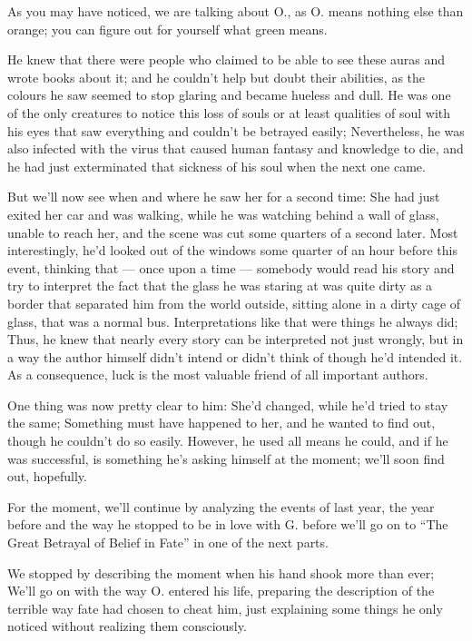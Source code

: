 As you may have noticed, we are talking about O., as O. means nothing else than orange; you can figure out for yourself what green means.

He knew that there were people who claimed to be able to see these auras and wrote books about it; and he couldn't help but doubt their abilities, as the colours he saw seemed to stop glaring and became hueless and dull. He was one of the only creatures to notice this loss of souls or at least qualities of soul with his eyes that saw everything and couldn't be betrayed easily; Nevertheless, he was also infected with the virus that caused human fantasy and knowledge to die, and he had just exterminated that sickness of his soul when the next one came.

But we'll now see when and where he saw her for a second time: She had just exited her car and was walking, while he was watching behind a wall of glass, unable to reach her, and the scene was cut some quarters of a second later. Most interestingly, he'd looked out of the windows some quarter of an hour before this event, thinking that --- once upon a time --- somebody would read his story and try to interpret the fact that the glass he was staring at was quite dirty as a border that separated him from the world outside, sitting alone in a dirty cage of glass, that was a normal bus. Interpretations like that were things he always did; Thus, he knew that nearly every story can be interpreted not just wrongly, but in a way the author himself didn't intend or didn't think of though he'd intended it. As a consequence, luck is the most valuable friend of all important authors.

One thing was now pretty clear to him: She'd changed, while he'd tried to stay the same; Something must have happened to her, and he wanted to find out, though he couldn't do so easily. However, he used all means he could, and if he was successful, is something he's asking himself at the moment; we'll soon find out, hopefully.

For the moment, we'll continue by analyzing the events of last year, the year before and the way he stopped to be in love with G. before we'll go on to \enquote{The Great Betrayal of Belief in Fate} in one of the next parts.

We stopped by describing the moment when his hand shook more than ever; We'll go on with the way O. entered his life, preparing the description of the terrible way fate had chosen to cheat him, just explaining some things he only noticed without realizing them consciously.

